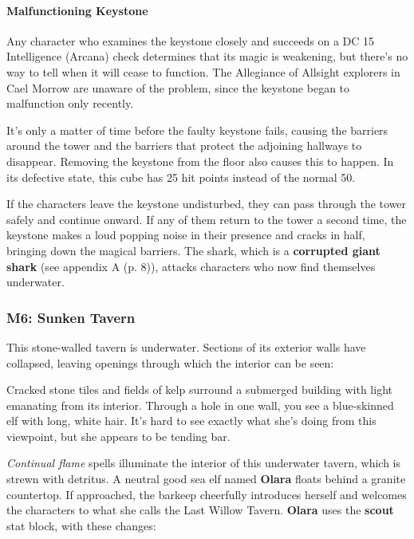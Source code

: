 \documentclass[a4paper, 11pt, bg=full, twocolumn, nooutline]{dndbook}
\begin{document}
\paragraph{Malfunctioning Keystone}

Any character who examines the keystone closely and succeeds on a DC 15 Intelligence (Arcana) check determines that its magic is weakening, but there's no way to tell when it will cease to function. The Allegiance of Allsight explorers in Cael Morrow are unaware of the problem, since the keystone began to malfunction only recently.

It's only a matter of time before the faulty keystone fails, causing the barriers around the tower and the barriers that protect the adjoining hallways to disappear. Removing the keystone from the floor also causes this to happen. In its defective state, this cube has 25 hit points instead of the normal 50.

If the characters leave the keystone undisturbed, they can pass through the tower safely and continue onward. If any of them return to the tower a second time, the keystone makes a loud popping noise in their presence and cracks in half, bringing down the magical barriers. The shark, which is a \textbf{corrupted giant shark} (see appendix A (p. 8)), attacks characters who now find themselves underwater.

\subsubsection{M6: Sunken Tavern}

This stone-walled tavern is underwater. Sections of its exterior walls have collapsed, leaving openings through which the interior can be seen:

\begin{DndReadAloud}
Cracked stone tiles and fields of kelp surround a submerged building with light emanating from its interior. Through a hole in one wall, you see a blue-skinned elf with long, white hair. It's hard to see exactly what she's doing from this viewpoint, but she appears to be tending bar.
\end{DndReadAloud}

\textit{Continual flame} spells illuminate the interior of this underwater tavern, which is strewn with detritus. A neutral good sea elf named \textbf{Olara} floats behind a granite countertop. If approached, the barkeep cheerfully introduces herself and welcomes the characters to what she calls the Last Willow Tavern. \textbf{Olara} uses the \textbf{scout} stat block, with these changes:
\end{document}
